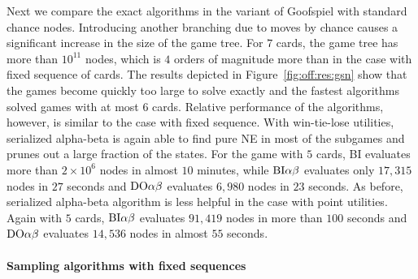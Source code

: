 {Next we compare the exact algorithms in the variant of Goofspiel with standard chance nodes.
Introducing another branching due to moves by chance causes a significant increase in the size of the game tree.
For $7$ cards, the game tree has more than $10^{11}$ nodes, which is $4$ orders of magnitude more than in the case with fixed sequence of cards.
The results depicted in Figure~\ref{fig:off:res:gsn} show that the games become quickly too large to solve exactly and the fastest algorithms solved games with at most $6$ cards.
Relative performance of the algorithms, however, is similar to the case with fixed sequence.
With win-tie-lose utilities, serialized alpha-beta is again able to find pure NE in most of the subgames and prunes out a large fraction of the states.
For the game with $5$ cards, BI evaluates more than $2 \times 10^6$ nodes in almost $10$ minutes, while $\textrm{BI}\alpha\beta$ evaluates only $17,315$ nodes in $27$ seconds and $\textrm{DO}\alpha\beta$ evaluates $6,980$ nodes in $23$ seconds.
As before, serialized alpha-beta algorithm is less helpful in the case with point utilities.
Again with $5$ cards, $\textrm{BI}\alpha\beta$ evaluates $91,419$ nodes in more than $100$ seconds and $\textrm{DO}\alpha\beta$ evaluates $14,536$ nodes in almost $55$ seconds.
}

\paragraph{Sampling algorithms with fixed sequences}

